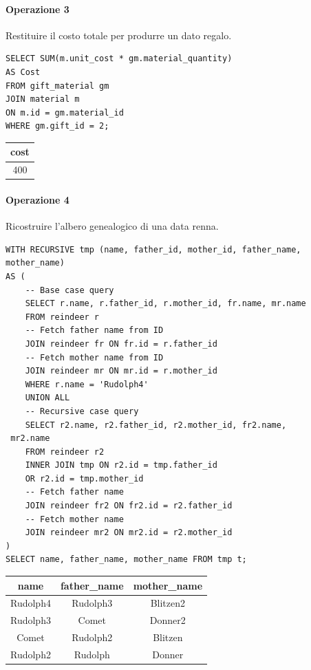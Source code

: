 \documentclass[12pt]{report}
\begin{document}
\paragraph{Operazione 3} Restituire il costo totale per produrre un dato regalo.
\begin{lstlisting}
SELECT SUM(m.unit_cost * gm.material_quantity)
AS Cost
FROM gift_material gm
JOIN material m
ON m.id = gm.material_id 
WHERE gm.gift_id = 2;
\end{lstlisting}
\begin{center}
\begin{tabular}{|c|}
  \hline
  cost \\ \hline
  400 \\ \hline
\end{tabular}
\end{center}



\paragraph{Operazione 4} Ricostruire l'albero genealogico di una data renna.
\begin{lstlisting}
WITH RECURSIVE tmp (name, father_id, mother_id, father_name, 
mother_name)
AS (
	-- Base case query
	SELECT r.name, r.father_id, r.mother_id, fr.name, mr.name
	FROM reindeer r
	-- Fetch father name from ID
	JOIN reindeer fr ON fr.id = r.father_id
	-- Fetch mother name from ID
	JOIN reindeer mr ON mr.id = r.mother_id
	WHERE r.name = 'Rudolph4'
	UNION ALL
	-- Recursive case query
	SELECT r2.name, r2.father_id, r2.mother_id, fr2.name,
 mr2.name
	FROM reindeer r2
	INNER JOIN tmp ON r2.id = tmp.father_id 
    OR r2.id = tmp.mother_id
	-- Fetch father name
	JOIN reindeer fr2 ON fr2.id = r2.father_id
	-- Fetch mother name
	JOIN reindeer mr2 ON mr2.id = r2.mother_id
)
SELECT name, father_name, mother_name FROM tmp t;
\end{lstlisting}
\begin{center}
\begin{tabular}{|c|c|c|}
  \hline
  name & father\_name & mother\_name \\ \hline
  Rudolph4 & Rudolph3 & Blitzen2 \\ \hline
  Rudolph3 & Comet & Donner2 \\ \hline
  Comet & Rudolph2 & Blitzen \\ \hline
  Rudolph2 & Rudolph & Donner \\ \hline
\end{tabular}
\end{center}
\end{document}
